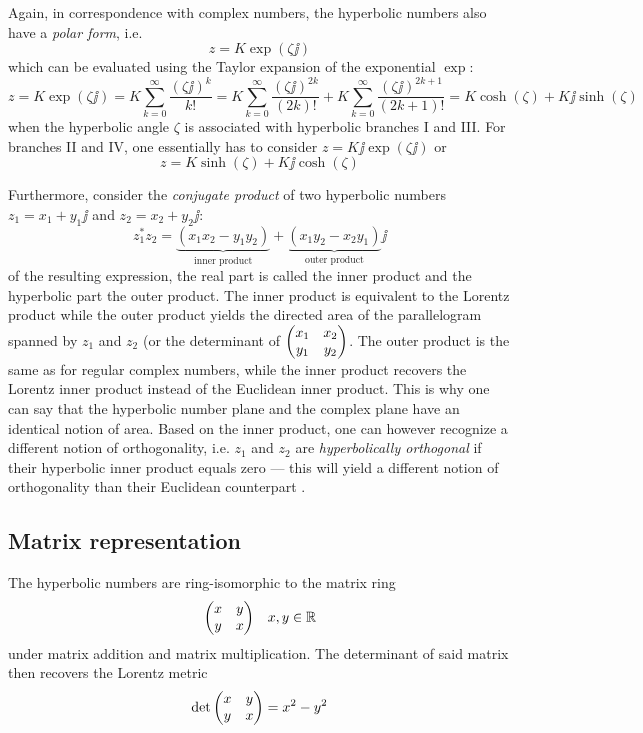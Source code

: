 Again, in correspondence with complex numbers, the hyperbolic numbers also have a  \emph{polar form}, i.e.
\[
     z = K \exp(\zeta \jj)
\]
which can be evaluated using the Taylor expansion of the exponential \(\exp\):
\[
     z = K\exp(\zeta \jj) = K \sum^\infty_{k = 0} \frac{(\zeta \jj)^k}{k!} =  K \sum^\infty_{k = 0} \frac{(\zeta \jj)^{2k}}{(2k)!} + K \sum^\infty_{k = 0} \frac{(\zeta \jj)^{2k+1}}{(2k + 1)!} = K\cosh(\zeta) + K\jj\sinh(\zeta)
\]
when the hyperbolic angle \(\zeta\) is associated with hyperbolic branches I and III. For branches II and IV, one essentially has to consider \(z = K\jj\exp(\zeta\jj)\) or
\[
     z = K\sinh(\zeta) + K\jj\cosh(\zeta)
\]

Furthermore, consider the \emph{conjugate product} of two hyperbolic numbers \(z_1 = x_1 + y_1\jj\) and \(z_2 = x_2 + y_2\jj\):
\[
     z_1^*z_2 = \underbrace{(x_1x_2 - y_1y_2)}_\text{inner product} 
            + \underbrace{(x_1y_2 - x_2y_1)}_\text{outer product}\jj
\]
of the resulting expression, the real part is called the inner product and the hyperbolic part the outer product. The inner product is equivalent to the Lorentz product while the outer product yields the directed area of the parallelogram spanned by \(z_1\) and \(z_2\) (or the determinant of \(\mqty(x_1 & x_2\\y_1&y_2)\). The outer product is the same as for regular complex numbers, while the inner product recovers the Lorentz inner product instead of the Euclidean inner product. This is why one can say that the hyperbolic number plane and the complex plane have an identical notion of area. Based on the inner product, one can however recognize a different notion of orthogonality, i.e. \(z_1\) and \(z_2\) are \emph{hyperbolically orthogonal} if their hyperbolic inner product equals zero --- this will yield a different notion of orthogonality than their Euclidean counterpart \cite{Needham1997, Sobczyk1995}.

\subsection{Matrix representation}
The hyperbolic numbers are ring-isomorphic to the matrix ring
\[
     \mqty(x & y \\ y & x) \quad x, y \in \real
\]
under matrix addition and matrix multiplication. The determinant of said matrix then recovers the Lorentz metric
\[
     \det \mqty(x & y \\ y & x) = x^2 - y^2
\]

